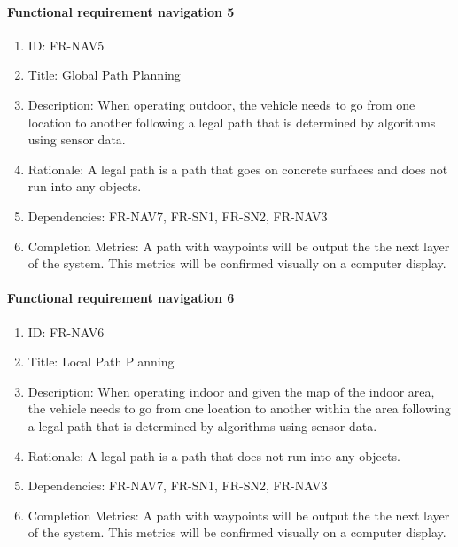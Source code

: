 \documentclass[compsoc,draftclsnofoot,onecolumn,10pt]{IEEEtran}
\begin{document}
	\paragraph{Functional requirement navigation 5}
		\begin{enumerate}
			\item ID: FR-NAV5
			\item Title: Global Path Planning
			\item Description: When operating outdoor, the vehicle needs to go from one location to another following a legal path that is determined by algorithms using sensor data.
			\item Rationale: A legal path is a path that goes on concrete surfaces and does not run into any objects.
			\item Dependencies: FR-NAV7, FR-SN1, FR-SN2, FR-NAV3
			\item Completion Metrics: A path with waypoints will be output the the next layer of the system. This metrics will be confirmed visually on
			a computer display. 
		\end{enumerate}

	\paragraph{Functional requirement navigation 6}
		\begin{enumerate}
			\item ID: FR-NAV6
			\item Title: Local Path Planning
			\item Description: When operating indoor and given the map of the indoor area, the vehicle needs to go from one location to another within the area following a legal path that is determined by algorithms using sensor data.
			\item Rationale: A legal path is a path that does not run into any objects.
			\item Dependencies: FR-NAV7, FR-SN1, FR-SN2, FR-NAV3
			\item Completion Metrics: A path with waypoints will be output the the next layer of the system. This metrics will be confirmed visually on
			a computer display. 
		\end{enumerate}
\end{document}
